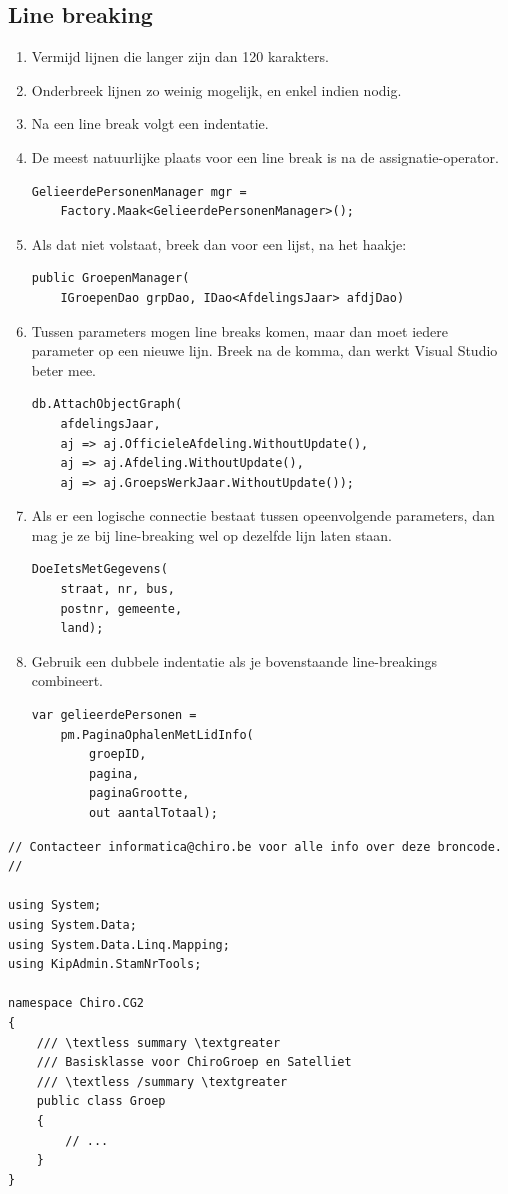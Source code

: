 \documentclass[a4paper,11pt]{article}
\begin{document}
\subsection{Line breaking}
\begin{enumerate}[resume]
\item Vermijd lijnen die langer zijn dan 120 karakters.
\item Onderbreek lijnen zo weinig mogelijk, en enkel indien nodig.
\item Na een line break volgt een indentatie.
\item De meest natuurlijke plaats voor een line break is na de
assignatie-operator.
\begin{lstlisting}
GelieerdePersonenManager mgr =
	Factory.Maak<GelieerdePersonenManager>();
\end{lstlisting}
\item Als dat niet volstaat, breek dan voor een lijst, na het haakje:
\begin{lstlisting}
public GroepenManager(
	IGroepenDao grpDao, IDao<AfdelingsJaar> afdjDao)
\end{lstlisting}
\item Tussen parameters mogen line breaks komen, maar dan moet iedere
parameter op een nieuwe lijn.  Breek na de komma, dan werkt Visual Studio
beter mee.
\begin{lstlisting}
db.AttachObjectGraph(
	afdelingsJaar,
	aj => aj.OfficieleAfdeling.WithoutUpdate(),
	aj => aj.Afdeling.WithoutUpdate(),
	aj => aj.GroepsWerkJaar.WithoutUpdate());
\end{lstlisting}
\item Als er een logische connectie bestaat tussen opeenvolgende parameters,
dan mag je ze bij line-breaking wel op dezelfde lijn laten staan.
\begin{lstlisting}
DoeIetsMetGegevens(
	straat, nr, bus,
	postnr, gemeente,
	land);
\end{lstlisting}
\item Gebruik een dubbele indentatie als je bovenstaande line-breakings
combineert.
\begin{lstlisting}
var gelieerdePersonen =
	pm.PaginaOphalenMetLidInfo(
		groepID,
		pagina,
		paginaGrootte,
		out aantalTotaal);
\end{lstlisting}
\end{enumerate}

\begin{lstlisting}[float, caption=Opbouw, label=lblLstOpbouw]
// Contacteer informatica@chiro.be voor alle info over deze broncode.
//

using System;
using System.Data;
using System.Data.Linq.Mapping;
using KipAdmin.StamNrTools;

namespace Chiro.CG2
{
	/// \textless summary \textgreater
	/// Basisklasse voor ChiroGroep en Satelliet
	/// \textless /summary \textgreater
	public class Groep
	{
		// ...
	}
}
\end{lstlisting}
\end{document}
